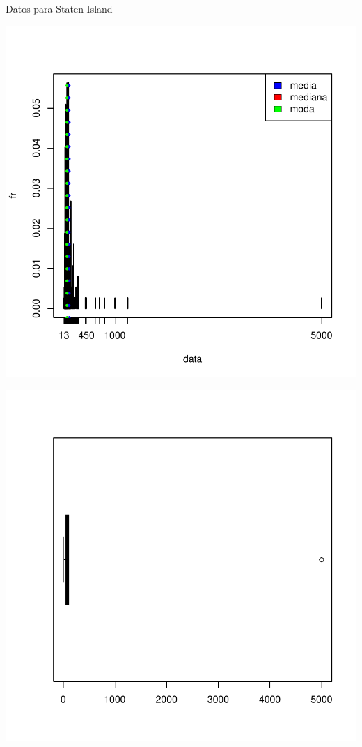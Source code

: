 \documentclass [a4paper] {article}
\begin{document}
Datos para Staten Island
\begin{center}
\includegraphics{entrega-037}
\end{center}
\begin{center}
\includegraphics{entrega-038}
\end{center}
\end{document}
